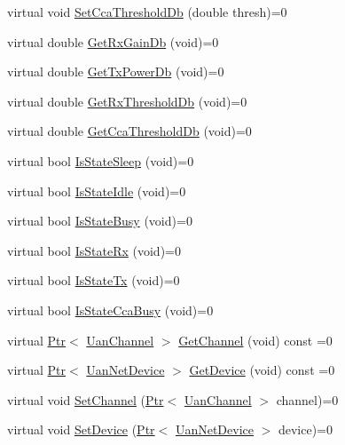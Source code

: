 \begin{DoxyCompactItemize}
\item 
virtual void \hyperlink{classns3_1_1UanPhy_a4f3cfc4f1bab5d79bdaa27d3bd11540a}{Set\+Cca\+Threshold\+Db} (double thresh)=0
\item 
virtual double \hyperlink{classns3_1_1UanPhy_a4c33eeebf6f378ce8bdd1af9469f9854}{Get\+Rx\+Gain\+Db} (void)=0
\item 
virtual double \hyperlink{classns3_1_1UanPhy_a329a79c9ca506895264500c0e7193805}{Get\+Tx\+Power\+Db} (void)=0
\item 
virtual double \hyperlink{classns3_1_1UanPhy_af7b6edd6e514d1714a074ea9b1c683e3}{Get\+Rx\+Threshold\+Db} (void)=0
\item 
virtual double \hyperlink{classns3_1_1UanPhy_a4f777385fb16bc24c7e969e3ba951411}{Get\+Cca\+Threshold\+Db} (void)=0
\item 
virtual bool \hyperlink{classns3_1_1UanPhy_af3ba891420f1af01784a403ca62f41a7}{Is\+State\+Sleep} (void)=0
\item 
virtual bool \hyperlink{classns3_1_1UanPhy_abd7036f617a780656c19a984095fc9be}{Is\+State\+Idle} (void)=0
\item 
virtual bool \hyperlink{classns3_1_1UanPhy_acccbeb115ca25c12dbaf3d0b23aac674}{Is\+State\+Busy} (void)=0
\item 
virtual bool \hyperlink{classns3_1_1UanPhy_abedaf2bf749a223870463ff02b7a08ce}{Is\+State\+Rx} (void)=0
\item 
virtual bool \hyperlink{classns3_1_1UanPhy_adead903eb532d9b955451e17c69307b4}{Is\+State\+Tx} (void)=0
\item 
virtual bool \hyperlink{classns3_1_1UanPhy_aa8b8b674d8342ff65d0b91d8f2bf1f75}{Is\+State\+Cca\+Busy} (void)=0
\item 
virtual \hyperlink{classns3_1_1Ptr}{Ptr}$<$ \hyperlink{classns3_1_1UanChannel}{Uan\+Channel} $>$ \hyperlink{classns3_1_1UanPhy_a794ee168c6cee83a1cb975716aa7bbd2}{Get\+Channel} (void) const =0
\item 
virtual \hyperlink{classns3_1_1Ptr}{Ptr}$<$ \hyperlink{classns3_1_1UanNetDevice}{Uan\+Net\+Device} $>$ \hyperlink{classns3_1_1UanPhy_a9471d60b88d6fd476fa931155e564ff6}{Get\+Device} (void) const =0
\item 
virtual void \hyperlink{classns3_1_1UanPhy_a287422cf8f4d8e1cd1f5972f258cc21e}{Set\+Channel} (\hyperlink{classns3_1_1Ptr}{Ptr}$<$ \hyperlink{classns3_1_1UanChannel}{Uan\+Channel} $>$ channel)=0
\item 
virtual void \hyperlink{classns3_1_1UanPhy_a5dd8b9c5569d9d7d186a9109d459af4d}{Set\+Device} (\hyperlink{classns3_1_1Ptr}{Ptr}$<$ \hyperlink{classns3_1_1UanNetDevice}{Uan\+Net\+Device} $>$ device)=0

\end{DoxyCompactItemize}
